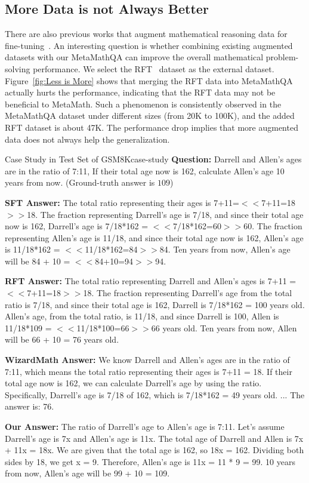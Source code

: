 \vspace{2mm}  
\subsection{More Data is not Always Better}
\vspace{-1mm}
    
There are also previous works that augment mathematical reasoning data for fine-tuning~\citep{luo2023wizardmath,yuan2023scaling}. An interesting question is whether combining existing augmented datasets with our {MetaMathQA} can improve the overall mathematical problem-solving performance. We select the RFT~\citep{yuan2023scaling} dataset as the external dataset. Figure~\ref{fig:Less is More} shows that merging the RFT data into {MetaMathQA} actually hurts the performance,
indicating that the RFT data may not be beneficial to {MetaMath}. Such a phenomenon is consistently observed in the {MetaMathQA} dataset under different sizes (from 20K to 100K), and the added RFT dataset is about 47K. The performance drop implies that more augmented data does not always help the generalization. 

\vspace{2.5mm}
\begin{exmp}{Case Study in Test Set of GSM8K}{case-study}\small
\textbf{Question:}
Darrell and Allen's ages are in the ratio of 7:11, If their total age now is 162, calculate Allen's age 10 years from now. {\color{red3}(Ground-truth answer is $109$)}

\textbf{SFT Answer:}
The total ratio representing their ages is 7+11=$<<$7+11=18$>>$18. The fraction representing Darrell's age is 7/18, and since their total age now is 162, Darrell's age is 7/18*162 = $<<$7/18*162=60$>>$60. The fraction representing Allen's age is 11/18, and since their total age now is 162, Allen's age is 11/18*162 = $<<$11/18*162=84$>>$84. Ten years from now, Allen's age will be 84 + 10 = $<<$84+10=94$>>$94.

\textbf{RFT Answer:}
The total ratio representing Darrell and Allen's ages is 7+11 = $<<$7+11=18$>>$18. The fraction representing Darrell's age from the total ratio is 7/18, and since their total age is 162, Darrell is 7/18*162 = 100 years old. Allen's age, from the total ratio, is 11/18, and since Darrell is 100, Allen is 11/18*109 = $<<$11/18*100=66$>>$66 years old. Ten years from now, Allen will be 66 + 10 = 76 years old.

\textbf{WizardMath Answer:}
We know Darrell and Allen's ages are in the ratio of 7:11, which means the total ratio representing their ages is 7+11 = 18. If their total age now is 162, we can calculate Darrell's age by using the ratio. Specifically, Darrell's age is 7/18 of 162, which is 7/18*162 = 49 years old.  ...  The answer is: 76.

\textbf{Our Answer:}
The ratio of Darrell's age to Allen's age is 7:11. Let's assume Darrell's age is 7x and Allen's age is 11x. The total age of Darrell and Allen is 7x + 11x = 18x. We are given that the total age is 162, so 18x = 162. Dividing both sides by 18, we get x = 9. Therefore, Allen's age is 11x = 11 * 9 = 99. 10 years from now, Allen's age will be 99 + 10 = 109.
\end{exmp}

